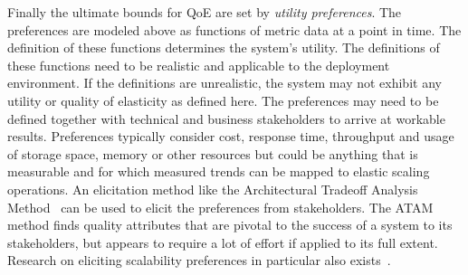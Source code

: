 \documentclass[english]{tktltiki2}
\theoremstyle{definition}
\theoremstyle{remark}
\begin{document}
Finally the ultimate bounds for QoE are set by \textit{utility preferences}. The
preferences are modeled above as functions of metric data at a point in time.
The definition of these functions determines the system's utility. The
definitions of these functions need to be realistic and applicable to the
deployment environment. If the definitions are unrealistic, the system may not
exhibit any utility or quality of elasticity as defined here. The preferences
may need to be defined together with technical and business stakeholders to
arrive at workable results. Preferences typically consider cost, response time,
throughput and usage of storage space, memory or other resources but could be
anything that is measurable and for which measured trends can be mapped to
elastic scaling operations. An elicitation method like the Architectural
Tradeoff Analysis Method~\cite{ATAM} can be used to elicit the preferences from
stakeholders. The ATAM method finds quality attributes that are pivotal to the
success of a system to its stakeholders, but appears to require a lot of effort
if applied to its full extent. Research on eliciting scalability preferences in particular also exists~\cite{DubocUtility}.
\clearpage
	\begin{table}[h]
	    \caption{QoE factors and the system components which can affect them.}
	    \label{table:QoEFactors}

	\end{table}
\end{document}
